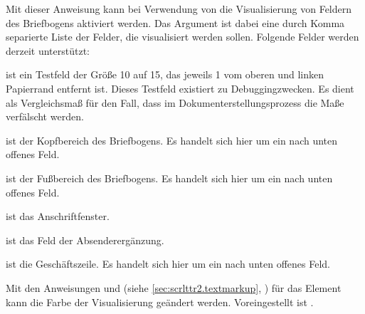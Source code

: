 \begin{Declaration}
\end{Declaration}
Mit dieser Anweisung kann bei Verwendung von  die
Visualisierung von Feldern des Briefbogens aktiviert werden. Das Argument
 ist dabei eine durch Komma separierte Liste der Felder, die
visualisiert werden sollen. Folgende Felder werden derzeit unterstützt:
\begin{description}
\item[\PValue{test}] ist ein Testfeld der Größe 10 auf 15,
  das jeweils 1 vom oberen und linken Papierrand entfernt ist. Dieses
  Testfeld existiert zu Debuggingzwecken. Es dient als Vergleichsmaß für den
  Fall, dass im Dokumenterstellungsprozess die Maße verfälscht werden.
\item[\PValue{head}] ist der Kopfbereich des Briefbogens. Es handelt sich hier
  um ein nach unten offenes Feld.
\item[\PValue{foot}] ist der Fußbereich des Briefbogens. Es handelt sich hier
  um ein nach unten offenes Feld.
\item[\PValue{address}] ist das Anschriftfenster.
\item[\PValue{location}] ist das Feld der Absenderergänzung.
\item[\PValue{refline}] ist die Geschäftszeile. Es handelt sich hier um ein
  nach unten offenes Feld.
\end{description}
%
Mit den Anweisungen  und
 (siehe \autoref{sec:scrlttr2.textmarkup},
) für das Element
 kann die Farbe der
Visualisierung geändert werden. Voreingestellt ist .%
%
%
\EndIndexGroup


